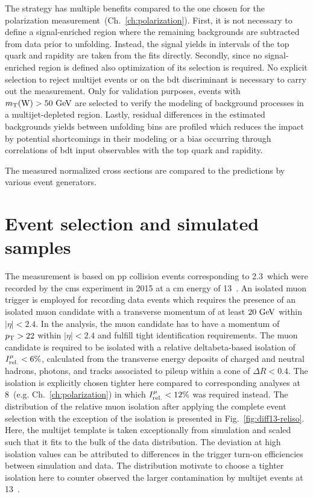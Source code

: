 The strategy has multiple benefits compared to the one chosen for the polarization measurement~(Ch.~\ref{ch:polarization}). First, it is not necessary to define a signal-enriched region where the remaining backgrounds are subtracted from data prior to unfolding. Instead, the signal yields in intervals of the top quark \pt and rapidity are taken from the fits directly. Secondly, since no signal-enriched region is defined also optimization of its selection is required. No explicit selection to reject multijet events or on the \gls{bdt} discriminant is necessary to carry out the measurement. Only for validation purposes, events with $m_{\textrm{T}}(\textrm{W})>50~\textrm{GeV}$ are selected to verify the modeling of background processes in a multijet-depleted region. Lastly, residual differences in the estimated backgrounds yields between unfolding bins are profiled which reduces the impact by potential shortcomings in their modeling or a bias occurring through correlations of \gls{bdt} input observables with the top quark \pt and rapidity.

The measured normalized cross sections are compared to the predictions by various event generators.

\section{Event selection and simulated samples}

The measurement is based on \gls{pp} collision events corresponding to 2.3~\invfb which were recorded by the \gls{cms} experiment in 2015 at a \acrlong{cm} energy of 13~\TeV. An isolated muon trigger is employed for recording data events which requires the presence of an isolated muon candidate with a transverse momentum of at least $20~\textrm{GeV}$ within $|\eta|<2.4$. In the analysis, the muon candidate has to have a momentum of $p_\textrm{T}>22$ within $|\eta|<2.4$ and fulfill tight identification requirements. The muon candidate is required to be isolated with a relative \gls{deltabeta}-based isolation of $I_\textrm{rel.}^{\mu}<6\%$, calculated from the transverse energy deposits of charged and neutral hadrons, photons, and tracks associated to pileup within a cone of $\Delta R<0.4$. The isolation is explicitly chosen tighter here compared to corresponding analyses at 8~\TeV (e.g. Ch.~\ref{ch:polarization}) in which $I_\textrm{rel.}^{\mu}<12\%$ was required instead. The distribution of the relative muon isolation after applying the complete event selection with the exception of the isolation is presented in Fig.~\ref{fig:diff13-reliso}. Here, the multijet template is taken exceptionally from simulation and scaled such that it fits to the bulk of the data distribution. The deviation at high isolation values can be attributed to differences in the trigger turn-on efficiencies between simulation and data. The distribution motivate to choose a tighter isolation here to counter observed the larger contamination by multijet events at 13~\TeV.

